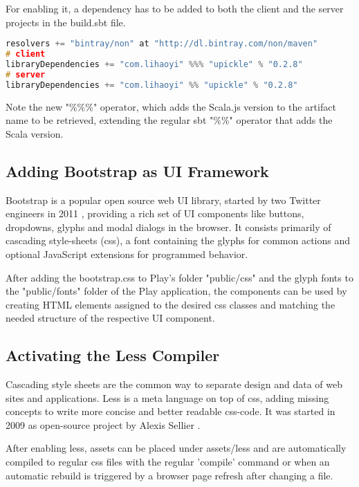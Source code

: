 For enabling it, a dependency has to be added to both the client and the server projects in the build.sbt file.

\begin{lstlisting}[caption={Adding a dependency to the client and server project},basicstyle=\tiny\ttfamily,language=c,aboveskip=15pt]
resolvers += "bintray/non" at "http://dl.bintray.com/non/maven"
# client
libraryDependencies += "com.lihaoyi" %%% "upickle" % "0.2.8"
# server
libraryDependencies += "com.lihaoyi" %% "upickle" % "0.2.8"
\end{lstlisting}

Note the new "\%\%\%" operator, which adds the Scala.js version to the artifact name to be retrieved, extending the regular sbt "\%\%" operator that adds the Scala version.

\subsection{Adding Bootstrap as UI Framework}

Bootstrap is a popular open source web UI library, started by two Twitter engineers in 2011 \cite{bootstrap}, providing a rich set of UI components like buttons, dropdowns, glyphs and modal dialogs in the browser. It consists primarily of cascading style-sheets (css), a font containing the glyphs for common actions and optional JavaScript extensions for programmed behavior.

After adding the bootstrap.css to Play's folder "public/css" and the glyph fonts to the "public/fonts" folder of the Play application, the components can be used by creating HTML elements assigned to the desired css classes and matching the needed structure of the respective UI component.

\subsection{Activating the Less Compiler}

Cascading style sheets are the common way to separate design and data of web sites and applications. Less is a meta language on top of css, adding missing concepts to write more concise and better readable css-code. It was started in 2009 as open-source project by Alexis Sellier \cite{less}.

After enabling less, assets can be placed under assets/less and are automatically compiled to regular css files with the regular 'compile' command or when an automatic rebuild is triggered by a browser page refresh after changing a file.


